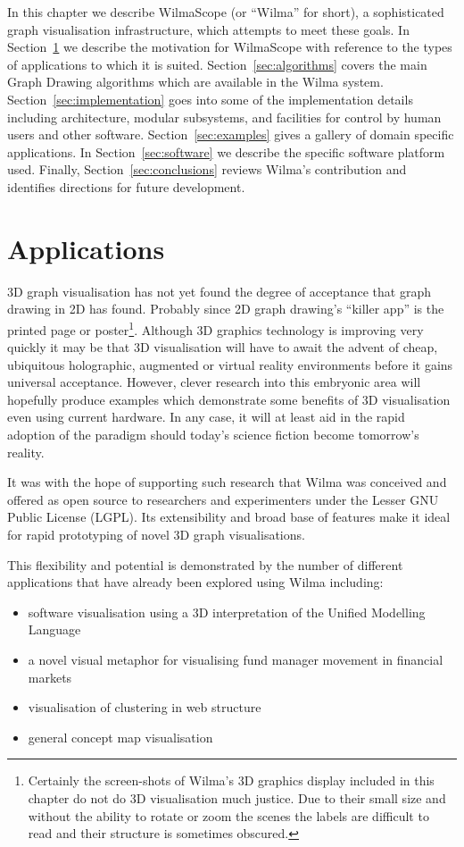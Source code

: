 \documentclass[runningheads]{cl2emult}
\begin{document}
In this chapter we describe WilmaScope (or ``Wilma'' for short), a
sophisticated graph visualisation infrastructure, which attempts to meet
these goals.  In Section~\ref{sec:applications} we describe the
motivation for WilmaScope with reference to the types of applications
to which it is suited.  Section~\ref{sec:algorithms} covers the
main Graph Drawing algorithms which are available in the Wilma system.
Section~\ref{sec:implementation} goes into some of the implementation
details including
architecture, modular subsystems, and facilities for control by human users
and other software.  Section~\ref{sec:examples} gives a gallery of
domain specific applications.  In Section~\ref{sec:software} we
describe the specific software platform used.  Finally,
Section~\ref{sec:conclusions} reviews Wilma's contribution and
identifies directions for future development.

\section{Applications} \label{sec:applications}
3D graph visualisation has not yet found the degree of acceptance that
graph drawing in 2D has found.  Probably since 2D graph drawing's
``killer app'' is the printed page or poster\footnote{Certainly the
screen-shots of Wilma's 3D graphics display included in this chapter
do not do 3D visualisation much justice.  Due to their small size and
without the ability to rotate or zoom the scenes the labels are 
difficult to read and their structure is sometimes obscured.}.
Although 3D graphics
technology is improving very quickly it may be that 3D visualisation
will have to await the advent of cheap, ubiquitous holographic,
augmented or virtual reality environments before it gains universal
acceptance.  However, clever research into this embryonic area will
hopefully produce examples which demonstrate some benefits of 3D
visualisation even using current hardware.  In any case, it will
at least aid in the rapid adoption of the paradigm should today's
science fiction become tomorrow's reality.

It was with the hope of supporting such research that Wilma was conceived
and offered as open
source to researchers and experimenters under the Lesser GNU Public
License (LGPL).
Its extensibility and broad base of
features make it ideal for rapid prototyping of novel 3D graph
visualisations.

This flexibility and potential is demonstrated by the 
number of different applications that have already been explored using
Wilma including: 
\begin{itemize}
\item software visualisation using a 3D interpretation of
the Unified Modelling Language
\item a novel visual metaphor for visualising
fund manager movement in financial markets
\item visualisation of
clustering in web structure
\item general concept map visualisation
\end{itemize}
\end{document}
